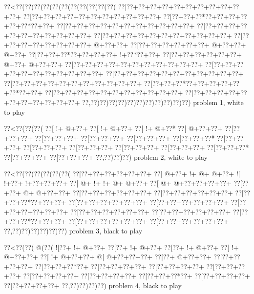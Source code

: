 \vbox{\vbox{\goo
\0??<\0??(\0??(\0??(\0??(\0??(\0??(\0??(\0??(\0??(\0??(\0??(
\0??[\0??+\0??+\0??+\0??+\0??+\0??+\0??+\0??+\0??+\0??+\0??+
\0??[\0??+\0??+\0??+\0??+\0??+\0??+\0??+\0??+\0??+\0??+\0??+
\0??[\0??+\0??+\0??*\0??+\0??+\0??+\0??+\0??+\0??*\0??+\0??+
\0??[\0??+\0??+\0??+\0??+\0??+\0??+\0??+\0??+\0??+\0??+\0??+
\0??[\0??+\0??+\0??+\0??+\0??+\0??+\0??+\0??+\0??+\0??+\0??+
\0??[\0??+\0??+\0??+\0??+\0??+\0??+\0??+\0??+\0??+\0??+\0??+
\0??[\0??+\0??+\0??+\0??+\0??+\0??+\0??+\0??+\- @+\0??+\0??+
\0??[\0??+\0??+\0??+\0??+\0??+\0??+\- @+\0??+\0??+\- @+\0??+
\0??[\0??+\0??+\0??*\0??+\0??+\0??+\0??+\- !+\0??*\0??+\0??+
\0??[\0??+\0??+\0??+\0??+\0??+\0??+\- @+\0??+\- @+\0??+\0??+
\0??[\0??+\0??+\0??+\0??+\0??+\0??+\0??+\0??+\0??+\0??+\0??+
\0??[\0??+\0??+\0??+\0??+\0??+\0??+\0??+\0??+\0??+\0??+\0??+
\0??[\0??+\0??+\0??+\0??+\0??+\0??+\0??+\0??+\0??+\0??+\0??+
\0??[\0??+\0??+\0??+\0??+\0??+\0??+\0??+\0??+\0??+\0??+\0??+
\0??[\0??+\0??+\0??*\0??+\0??+\0??+\0??+\0??+\0??*\0??+\0??+
\0??[\0??+\0??+\0??+\0??+\0??+\0??+\0??+\0??+\0??+\0??+\0??+
\0??[\0??+\0??+\0??+\0??+\0??+\0??+\0??+\0??+\0??+\0??+\0??+
\0??,\0??)\0??)\0??)\0??)\0??)\0??)\0??)\0??)\0??)\0??)\0??)
}
\hfil problem 1, white to play\hfil\break
}

\vbox{\vbox{\goo
\0??<\0??(\0??(\0??(
\0??[\- !+\- @+\0??+
\0??[\- !+\- @+\0??+
\0??[\- !+\- @+\0??*
\0??[\- @+\0??+\0??+
\0??[\0??+\0??+\0??+
\0??[\0??+\0??+\0??+
\0??[\0??+\0??+\0??+
\0??[\0??+\0??+\0??+
\0??[\0??+\0??+\0??*
\0??[\0??+\0??+\0??+
\0??[\0??+\0??+\0??+
\0??[\0??+\0??+\0??+
\0??[\0??+\0??+\0??+
\0??[\0??+\0??+\0??+
\0??[\0??+\0??+\0??*
\0??[\0??+\0??+\0??+
\0??[\0??+\0??+\0??+
\0??,\0??)\0??)\0??)
}
\hfil problem 2, white to play\hfil\break
}

\vbox{\vbox{\goo
\0??<\0??(\0??(\0??(\0??(\0??(\0??(
\0??[\0??+\0??+\0??+\0??+\0??+\0??+
\0??[\- @+\0??+\- !+\- @+\- @+\0??+
\- ![\- !+\0??+\- !+\0??+\0??+\0??+
\0??[\- @+\- !+\- !+\- @+\- @+\0??+
\0??[\- @+\- @+\0??+\0??+\0??+\0??+
\0??[\0??+\0??+\- @+\- @+\0??+\0??+
\0??[\0??+\0??+\0??+\0??+\0??+\0??+
\0??[\0??+\0??+\0??+\0??+\0??+\0??+
\0??[\0??+\0??+\0??*\0??+\0??+\0??+
\0??[\0??+\0??+\0??+\0??+\0??+\0??+
\0??[\0??+\0??+\0??+\0??+\0??+\0??+
\0??[\0??+\0??+\0??+\0??+\0??+\0??+
\0??[\0??+\0??+\0??+\0??+\0??+\0??+
\0??[\0??+\0??+\0??+\0??+\0??+\0??+
\0??[\0??+\0??+\0??*\0??+\0??+\0??+
\0??[\0??+\0??+\0??+\0??+\0??+\0??+
\0??[\0??+\0??+\0??+\0??+\0??+\0??+
\0??,\0??)\0??)\0??)\0??)\0??)\0??)
}
\hfil problem 3, black to play\hfil\break
}

\vbox{\vbox{\goo
\0??<\0??(\0??(\- @(\0??(
\- ![\0??+\- !+\- @+\0??+
\0??[\0??+\- !+\- @+\0??+
\0??[\0??+\- !+\- @+\0??+
\0??[\- !+\- @+\0??+\0??+
\0??[\- !+\- @+\0??+\0??+
\- @[\- @+\0??+\0??+\0??+
\0??[\0??+\- @+\0??+\0??+
\0??[\0??+\0??+\0??+\0??+
\0??[\0??+\0??+\0??*\0??+
\0??[\0??+\0??+\0??+\0??+
\0??[\0??+\0??+\0??+\0??+
\0??[\0??+\0??+\0??+\0??+
\0??[\0??+\0??+\0??+\0??+
\0??[\0??+\0??+\0??+\0??+
\0??[\0??+\0??+\0??*\0??+
\0??[\0??+\0??+\0??+\0??+
\0??[\0??+\0??+\0??+\0??+
\0??,\0??)\0??)\0??)\0??)
}
\hfil problem 4, black to play\hfil\break
}

